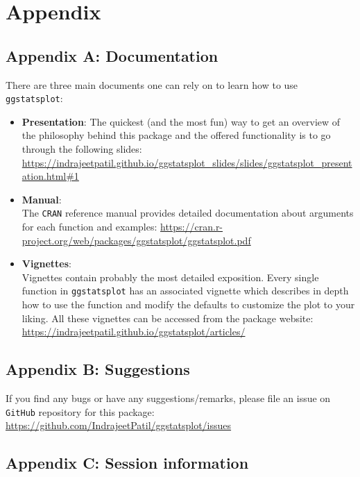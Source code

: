 \documentclass[
]{article}
\begin{document}
\hypertarget{appendix}{%
\section{Appendix}\label{appendix}}

\hypertarget{appendix-a-documentation}{%
\subsection{Appendix A: Documentation}\label{appendix-a-documentation}}

There are three main documents one can rely on to learn how to use
\texttt{ggstatsplot}:

\begin{itemize}
\item
  \textbf{Presentation}:
  The quickest (and the most fun) way to get an overview of
  the philosophy behind this package and the offered functionality is to go
  through the following slides:
  \url{https://indrajeetpatil.github.io/ggstatsplot_slides/slides/ggstatsplot_presentation.html\#1}
\item
  \textbf{Manual}:\\
  The \texttt{CRAN} reference manual provides detailed documentation about arguments
  for each function and examples:
  \url{https://cran.r-project.org/web/packages/ggstatsplot/ggstatsplot.pdf}
\item
  \textbf{Vignettes}:\\
  Vignettes contain probably the most detailed exposition. Every single
  function in \texttt{ggstatsplot} has an associated vignette which describes in
  depth how to use the function and modify the defaults to customize the plot
  to your liking. All these vignettes can be accessed from the package
  website: \url{https://indrajeetpatil.github.io/ggstatsplot/articles/}
\end{itemize}

\hypertarget{appendix-b-suggestions}{%
\subsection{Appendix B: Suggestions}\label{appendix-b-suggestions}}

If you find any bugs or have any suggestions/remarks, please file an issue on
\texttt{GitHub} repository for this package:
\url{https://github.com/IndrajeetPatil/ggstatsplot/issues}

\hypertarget{appendix-c-session-information}{%
\subsection{Appendix C: Session information}\label{appendix-c-session-information}}
\end{document}
